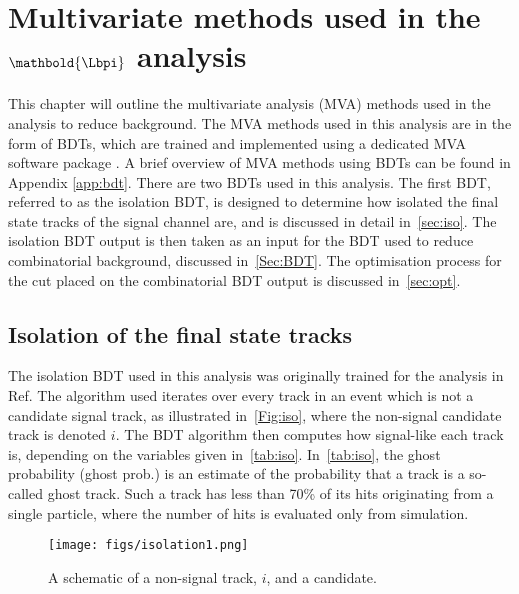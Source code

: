 \chapter{Multivariate methods used in the $\mathbold{\Lbpi}$ analysis}
\label{chap:bdt}
This chapter will outline the multivariate analysis (MVA) methods used in the \Lbpi analysis to reduce background. The MVA methods used in this analysis are in the form of BDTs, which are trained and implemented using a dedicated MVA software package \cite{TMVA}. A brief overview of MVA methods using BDTs can be found in Appendix \ref{app:bdt}. There are two BDTs used in this analysis. The first BDT, referred to as the isolation BDT, is designed to determine how isolated the final state tracks of the signal channel are, and is discussed in detail in~\autoref{sec:iso}. The isolation BDT output is then taken as an input for the BDT used to reduce combinatorial background, discussed in~\autoref{Sec:BDT}. The optimisation process for the cut placed on the combinatorial BDT output is discussed in~\autoref{sec:opt}.

\section{Isolation of the final state tracks}
\label{sec:iso}
The isolation BDT used in this analysis was originally trained for the analysis in Ref\cite{LHCB-ANA-2014-048}. The algorithm used iterates over every track in an event which is not a candidate signal track, as illustrated in~\autoref{Fig:iso}, where the non-signal candidate track is denoted $i$. The BDT algorithm then computes how signal-like each track is, depending on the variables given in~\autoref{tab:iso}. In~\autoref{tab:iso}, the ghost probability (ghost prob.) is an estimate of the probability that a track is a so-called \gls{ghost} track. Such a track has less than 70\% of its hits originating from a single particle, where the number of hits is evaluated only from simulation. %

\begin{figure}[ht!]
    \centering
  \texttt{[image: figs/isolation1.png]}
  \caption{A schematic of a non-signal track, $i$, and a \Lbpi candidate.}
    \label{Fig:iso}
\end{figure}



